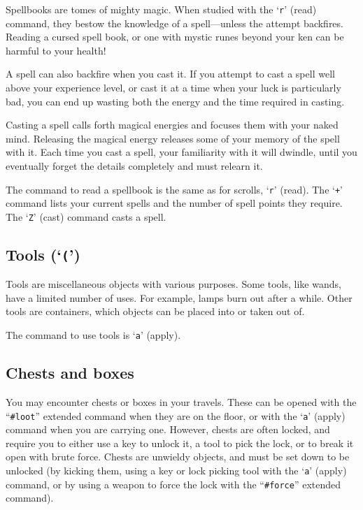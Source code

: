 Spellbooks are tomes of mighty magic.  When studied with the `{\tt r}' (read)
command, they bestow the knowledge of a spell---unless the attempt
backfires.
Reading a cursed spell book, or one with mystic runes beyond
your ken can be harmful to your health!

A spell can also backfire when you cast it.  If you attempt to cast a
spell well above your experience level, or cast it at a time when your
luck is particularly bad, you can end up wasting both the energy and
the time required in casting.

Casting a spell calls forth magical energies and focuses them with
your naked mind.  Releasing the magical energy releases some of your
memory of the spell with it.  Each time you cast a spell, your
familiarity with it will dwindle, until you eventually forget the
details completely and must relearn it.

The command to read a spellbook is the same as for scrolls, `{\tt r}'
(read).  The `{\tt +}' command lists your current spells and the number of
spell points they require.  The `{\tt Z}' (cast) command casts a spell.

\subsection*{Tools (`{\tt (}')}

Tools are miscellaneous objects with various purposes.  Some tools,
like wands, have a limited number of uses.  For example, lamps burn
out after a while.  Other tools are containers, which objects can
be placed into or taken out of.

The command to use tools is `{\tt a}' (apply).

\subsection*{Chests and boxes}

You may encounter chests or boxes in your travels.  These can be
opened with the ``{\tt \#loot}'' extended command when they are on the floor,
or with the `{\tt a}' (apply) command when you are carrying one.  However,
chests are often locked, and require you to either use a key to unlock
it, a tool to pick the lock, or to break it open with brute force.
Chests are unwieldy objects, and must be set down to be unlocked (by
kicking them, using a key or lock picking tool with the `{\tt a}' (apply)
command, or by using a weapon to force the lock with the ``{\tt \#force}''
extended command).

